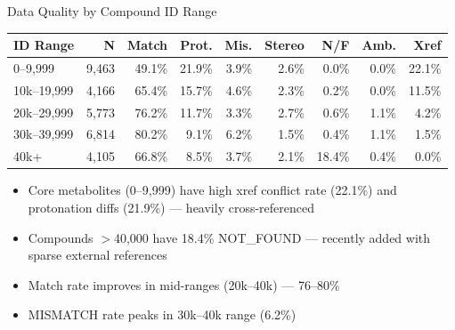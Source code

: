 \documentclass[aspectratio=169,11pt]{beamer}
\begin{document}
\begin{frame}{Data Quality by Compound ID Range}

\begin{table}[h]
\centering
\footnotesize
\begin{tabular}{lrrrrrrrr}
\toprule
\textbf{ID Range} & \textbf{N} & \textbf{Match} & \textbf{Prot.} & \textbf{Mis.} & \textbf{Stereo} & \textbf{N/F} & \textbf{Amb.} & \textbf{Xref} \\
\midrule
0--9{,}999    & 9,463 & 49.1\% & 21.9\% & 3.9\% & 2.6\% & 0.0\% & 0.0\% & 22.1\% \\
10k--19{,}999 & 4,166 & 65.4\% & 15.7\% & 4.6\% & 2.3\% & 0.2\% & 0.0\% & 11.5\% \\
20k--29{,}999 & 5,773 & 76.2\% & 11.7\% & 3.3\% & 2.7\% & 0.6\% & 1.1\% &  4.2\% \\
30k--39{,}999 & 6,814 & 80.2\% &  9.1\% & 6.2\% & 1.5\% & 0.4\% & 1.1\% &  1.5\% \\
40k+          & 4,105 & 66.8\% &  8.5\% & 3.7\% & 2.1\% & 18.4\% & 0.4\% & 0.0\% \\
\bottomrule
\end{tabular}
\end{table}

\bigskip
\begin{itemize}
  \item Core metabolites (0--9{,}999) have high xref conflict rate (22.1\%)
        and protonation diffs (21.9\%) --- heavily cross-referenced
  \item Compounds $>$40{,}000 have 18.4\% NOT\_FOUND --- recently added with
        sparse external references
  \item Match rate improves in mid-ranges (20k--40k) --- 76--80\%
  \item MISMATCH rate peaks in 30k--40k range (6.2\%)
\end{itemize}

\end{frame}
\end{document}
